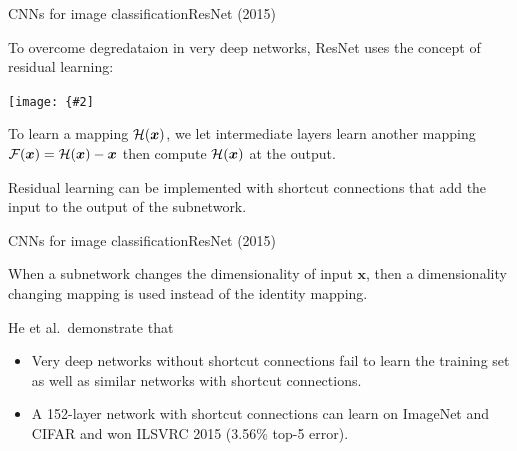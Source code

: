 \documentclass[aspectratio=169]{beamer}
\renewcommand{\vec}[1]{\boldsymbol{#1}}
\newcommand{\myfig}[3]{\centerline{\texttt{[image: \{\#2]}}}
\begin{document}
\begin{frame}{CNNs for image classification}{ResNet (2015)}

  To overcome degredataion in very deep networks, ResNet uses the
  concept of \alert{residual learning}:

  \medskip

  \myfig{2in}{he-fig2}{He et al.\ (2016), Fig.\ 2}

  \medskip

  To learn a mapping ${\cal H}(\vec{x})$, we let intermediate layers
  learn another mapping ${\cal F}(\vec{x}) = {\cal H}(\vec{x})-\vec{x}$
  then compute ${\cal H}(\vec{x})$ at the output.

  \medskip

  Residual learning can be implemented with \alert{shortcut
    connections} that add the input to the output of the subnetwork.
  
\end{frame}


\begin{frame}{CNNs for image classification}{ResNet (2015)}

  When a subnetwork changes the dimensionality of input $\vec{x}$,
  then a dimensionality changing mapping is used instead of the
  identity mapping.

  \medskip
  
  He et al.\ demonstrate that
  \begin{itemize}
    \item Very deep networks without shortcut connections fail to
      learn the training set as well as similar networks with shortcut
      connections.
    \item A \alert{152-layer network} with shortcut connections can
      learn on ImageNet and CIFAR and won ILSVRC 2015 (3.56\% top-5
      error).
  \end{itemize}
  
\end{frame}
\end{document}
